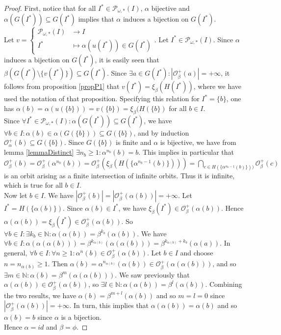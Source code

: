\documentclass[a4paper,11pt]{article}
\theoremstyle{plain}
\theoremstyle{definition}
\theoremstyle{remark}
\begin{document}
\begin{proof}
First, notice that for all $I^* \in \mathcal{P}_{\omega,*}(I)$, $\alpha$ bijective and $\alpha(G(I^*)) \subseteq G(I^*)$ implies that $\alpha$ induces a bijection on $G(I^*)$. \\
Let $v = \begin{cases} \mathcal{P}_{\omega,*}(I) &\to I \\ I^* &\mapsto \alpha(u(I^*)) \in G(I^*) \end{cases}$. Let $I^* \in \mathcal{P}_{\omega,*}(I)$. Since $\alpha$ induces a bijection on $G(I^*)$, it is easily seen that $\beta(G(I^*)\setminus \{v(I^*)\}) \subseteq G(I^*)$. Since $\exists a \in G(I^*) : |\mathcal{O}^{+}_\beta(a)| = +\infty$, it follows from proposition \ref{propP1} that $v(I^*) = \xi_\beta(H(I^*))$, where we have used the notation of that proposition. Specifying this relation for $I^* = \{b\}$, one has $\alpha(b) = \alpha(u(\{b\})) = v(\{b\}) = \xi_\beta(H(\{b\})$ for all $b \in I$. \\
Since $\forall I^* \in \mathcal{P}_{\omega,*}(I) : \alpha(G(I^*)) \subseteq G(I^*)$, we have $\forall b \in I : \alpha(b) \in \alpha(G(\{b\})) \subseteq G(\{b\})$, and by induction $\mathcal{O}^{+}_\alpha(b) \subseteq G(\{b\})$. Since $G(\{b\})$ is finite and $\alpha$ is bijective, we have from lemma \ref{lemmaDistinct} $\exists n_b \geq 1 : \alpha^{n_b}(b) = b$. This implies in particular that $\mathcal{O}^{+}_\beta(b) = \mathcal{O}^{+}_\beta(\alpha^{n_b}(b)) = \mathcal{O}^{+}_\beta(\xi_\beta(H(\{\alpha^{n_b-1}(b)\}))) = \bigcap_{c \in H(\{\alpha^{n_b-1}(b)\}))} \mathcal{O}^{+}_\beta(c)$ is an orbit arising as a finite intersection of infinite orbits. Thus it is infinite, which is true for all $b \in I$. \\
Now let $b \in I$. We have $|\mathcal{O}^{+}_\beta(b)|=|\mathcal{O}^{+}_\beta(\alpha(b))|=+\infty$. Let $I^* = H(\{\alpha(b)\})$. Since $\alpha(b) \in I^*$, we have $\xi_\beta(I^*) \in \mathcal{O}^{+}_\beta(\alpha(b))$. Hence $\alpha(\alpha(b)) = \xi_\beta(I^*) \in \mathcal{O}^{+}_\beta(\alpha(b))$. So $\forall b \in I : \exists k_b \in \mathbb{N} : \alpha(\alpha(b)) = \beta^{k_b}(\alpha(b))$. We have $\forall b \in I :  \alpha(\alpha(\alpha(b))) = \beta^{k_{\alpha(b)}}(\alpha(\alpha(b))) = \beta^{k_{\alpha(b)}+k_b}(\alpha(a))$. In general, $\forall b \in I : \forall n \geq 1 : \alpha^n(b) \in \mathcal{O}^{+}_\beta(\alpha(b))$. Let $b \in I$ and choose $n = n_{\alpha(b)} \geq 1$. Then $\alpha(b) = \alpha^{n_{\alpha(b)}}(\alpha(b)) \in \mathcal{O}^{+}_\beta(\alpha(\alpha(b)))$, and so $\exists m \in \mathbb{N} : \alpha(b) = \beta^m(\alpha(\alpha(b)))$. We saw previously that $\alpha(\alpha(b)) \in \mathcal{O}^{+}_\beta(\alpha(b))$, so $\exists l \in \mathbb{N} : \alpha(\alpha(b)) = \beta^l(\alpha(b))$. Combining the two results, we have $\alpha(b) = \beta^{m+l}(\alpha(b))$ and so $m=l=0$ since $|\mathcal{O}^{+}_\beta(\alpha(b))| = +\infty$. In turn, this implies that $\alpha(\alpha(b)) = \alpha(b)$ and so $\alpha(b) = b$ since $\alpha$ is a bijection. \\
Hence $\alpha = id$ and $\beta = \phi$.
\end{proof}
\end{document}
